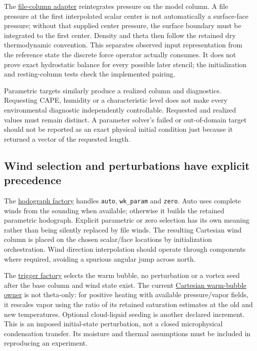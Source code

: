 The \href{../src/init/sounding/sources/file_sounding.cpp}{file-column adapter}
reintegrates pressure on the model column. A file pressure at the first
interpolated scalar center is not automatically a surface-face pressure;
without that supplied center pressure, the surface boundary must be integrated
to the first center. Density and theta then follow the retained dry
thermodynamic convention. This separates observed input representation from the
reference state the discrete force operator actually consumes. It does not
prove exact hydrostatic balance for every possible later stencil; the
initialization and resting-column tests check the implemented pairing.

Parametric targets similarly produce a realized column and diagnostics.
Requesting CAPE, humidity or a characteristic level does not make every
environmental diagnostic independently controllable. Requested and realized
values must remain distinct. A parameter solver's failed or out-of-domain
target should not be reported as an exact physical initial condition just
because it returned a vector of the requested length.

\subsection{Wind selection and perturbations have explicit precedence}

The \href{../src/init/hodograph/factory.cpp}{hodograph factory} handles
\texttt{auto}, \texttt{wk\_param} and \texttt{zero}. Auto uses complete winds
from the sounding when available; otherwise it builds the retained parametric
hodograph. Explicit parametric or zero selection has its own meaning rather
than being silently replaced by file winds. The resulting Cartesian wind
column is placed on the chosen scalar/face locations by initialization
orchestration. Wind direction interpolation should operate through components
where required, avoiding a spurious angular jump across north.

The \href{../src/init/trigger/factory.cpp}{trigger factory} selects the warm
bubble, no perturbation or a vortex seed after the base column and wind state
exist. The current
\href{../src/core/orchestration/dynamics/initial_conditions_cartesian.cpp}{Cartesian
warm-bubble owner} is not theta-only: for positive heating with available
pressure/vapor fields, it rescales vapor using the ratio of its retained
saturation estimates at the old and new temperatures. Optional cloud-liquid
seeding is another declared increment. This is an imposed initial-state
perturbation, not a closed microphysical condensation transfer. Its moisture
and thermal assumptions must be included in reproducing an experiment.

